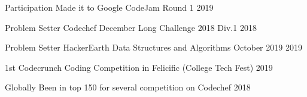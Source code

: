 \begin{cvhonors}

\cvhonor
{Participation} %
{Made it to Google CodeJam Round 1} %
{} %
{2019} %


\cvhonor
{Problem Setter} %
{Codechef December Long Challenge 2018 Div.1} %
{} %
{2018} %


\cvhonor
{Problem Setter} %
{HackerEarth Data Structures and Algorithms October 2019} %
{} %
{2019} %


\cvhonor
{1st} %
{Codecrunch Coding Competition in Felicific (College Tech Fest)} %
{} %
{2019} %


\cvhonor
{Globally} %
{Been in top 150 for several competition on Codechef} %
{} %
{2018} %










\end{cvhonors}